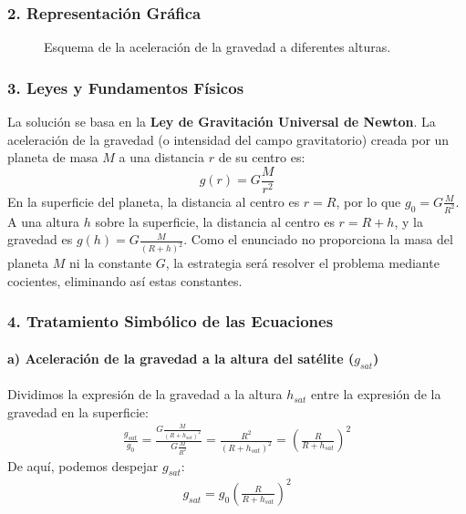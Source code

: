 \subsubsection*{2. Representación Gráfica}
\begin{figure}[H]
    \centering
    \caption{Esquema de la aceleración de la gravedad a diferentes alturas.}
\end{figure}

\subsubsection*{3. Leyes y Fundamentos Físicos}
La solución se basa en la \textbf{Ley de Gravitación Universal de Newton}. La aceleración de la gravedad (o intensidad del campo gravitatorio) creada por un planeta de masa $M$ a una distancia $r$ de su centro es:
$$ g(r) = G \frac{M}{r^2} $$
En la superficie del planeta, la distancia al centro es $r=R$, por lo que $g_0 = G \frac{M}{R^2}$. A una altura $h$ sobre la superficie, la distancia al centro es $r = R+h$, y la gravedad es $g(h) = G \frac{M}{(R+h)^2}$.
Como el enunciado no proporciona la masa del planeta $M$ ni la constante $G$, la estrategia será resolver el problema mediante cocientes, eliminando así estas constantes.

\subsubsection*{4. Tratamiento Simbólico de las Ecuaciones}
\paragraph*{a) Aceleración de la gravedad a la altura del satélite ($g_{sat}$)}
Dividimos la expresión de la gravedad a la altura $h_{sat}$ entre la expresión de la gravedad en la superficie:
\begin{gather}
    \frac{g_{sat}}{g_0} = \frac{G \frac{M}{(R+h_{sat})^2}}{G \frac{M}{R^2}} = \frac{R^2}{(R+h_{sat})^2} = \left(\frac{R}{R+h_{sat}}\right)^2
\end{gather}
De aquí, podemos despejar $g_{sat}$:
\begin{gather}
    g_{sat} = g_0 \left(\frac{R}{R+h_{sat}}\right)^2
\end{gather}

